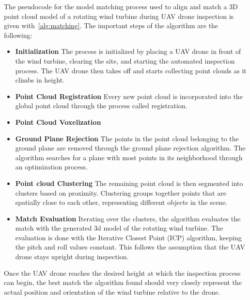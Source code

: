 The pseudocode for the model matching process used to align and match a 3D point cloud model of a rotating wind turbine during UAV drone inspection is given with~\ref{alg:matching}. The important steps of the algorithm are the following:
\begin{itemize}
    \item \textbf{Initialization} The process is initialized by placing a UAV drone in front of the wind turbine, clearing the site, and starting the automated inspection process. The UAV drone then takes off and starts collecting point clouds as it climbs in height.
    \item \textbf{Point Cloud Registration} Every new point cloud is incorporated into the global point cloud through the process called registration.
    \item \textbf{Point Cloud Voxelization}
    \item \textbf{Ground Plane Rejection} The points in the point cloud belonging to the ground plane are removed through the ground plane rejection algorithm. The algorithm searches for a plane with most points in its neighborhood through an optimization process.
    \item \textbf{Point cloud Clustering} The remaining point cloud is then segmented into clusters based on proximity. Clustering groups together points that are spatially close to each other, representing different objects in the scene.
    \item \textbf{Match Evaluation} Iterating over the clusters, the algorithm evaluates the match with the generated 3d model of the rotating wind turbine. The evaluation is done with the Iterative Closest Point (ICP) algorithm, keeping the pitch and roll values constant. This follows the assumption that the UAV drone stays upright during inspection.
\end{itemize}

Once the UAV drone reaches the desired height at which the inspection process can begin, the best match the algorithm found should very closely represent the actual position and orientation of the wind turbine relative to the drone.
